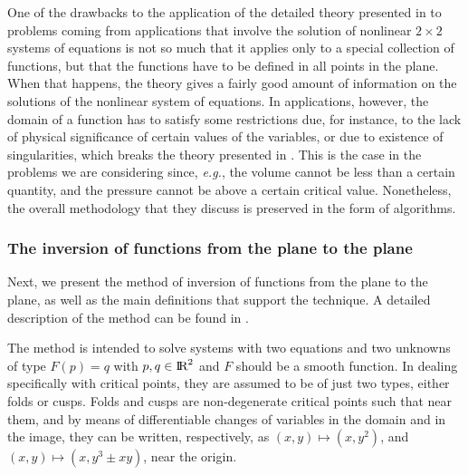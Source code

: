 \documentclass[journal=iecred,manuscript=article]{achemso}
\theoremstyle{definition}
\theoremstyle{remark}
\begin{document}
One of the drawbacks to the application of the detailed 
theory 
presented in 
\citet{malta} to problems coming from applications 
that involve the solution of nonlinear $2\times 2$ systems of 
equations
is not so much that it applies only to a special collection of
functions, but that the functions have to be defined 
in all points in the plane. When that happens, 
the theory gives a fairly good amount
of information on the solutions of the nonlinear system of 
equations.
In applications, however,  the domain of a function has to
satisfy some 
restrictions due, for instance, to the lack of physical
 significance
of certain values of the variables,
 or due to existence of singularities, 
which breaks the theory presented in \citet{malta}.
This is the case in the problems we are considering
since, {\em e.g.}, the volume cannot be less than a certain 
quantity,
and the pressure cannot be above a certain critical value.
 Nonetheless,
the overall methodology that they discuss is preserved 
in the form of algorithms.

\subsubsection{The inversion of functions from the plane to the plane}
Next, we present 
the method of inversion of functions from the plane to 
the plane,  as well as the main definitions 
that support the technique. A detailed description of the 
method can be found in \citet{malta}.

The method is intended to solve systems with two equations and
 two unknowns of type $ F\left(p\right) = q $ with $ p, q \in 
{\text{I\!R}}^2 $ and $ F $ should be a smooth function. In dealing specifically with critical points, they are assumed to be of just two types, either folds or cusps. 
Folds and cusps are non-degenerate 
critical points such that near them, and by means of
differentiable changes of variables in the domain and in the 
image, they can be written, respectively, 
as $(x,y)\mapsto (x,y^2)$, and $(x,y)\mapsto (x, y^3\pm xy)$,
near the origin.
\end{document}

